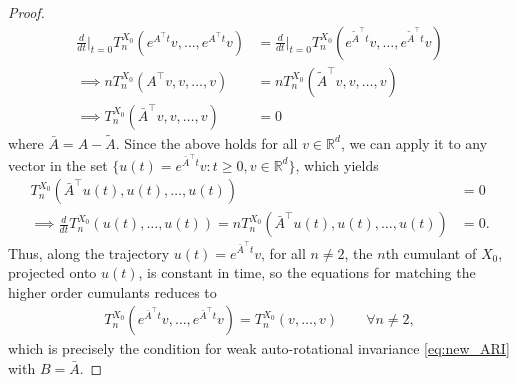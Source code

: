 \documentclass[twoside,11pt]{article}
\newcommand{\R} {\mathbb R}
\begin{document}
\begin{proof}
{\begin{align*}
    \frac{d}{dt}\bigg\rvert_{t=0}T_n^{X_0}(e^{A^\top t}v, \ldots, e^{A^\top t}v) &=\frac{d}{dt}\bigg\rvert_{t=0}T_n^{X_0}(e^{\tilde{A}^\top t}v, \ldots, e^{\tilde{A}^\top t} v)\\
    \implies nT_n^{X_0}(A^\top v,v, \ldots, v) &= nT_n^{X_0}(\tilde{A}^\top v, v,\ldots, v)\\
    \implies T_n^{X_0}(\bar{A}^\top v, v, \ldots, v) &=0
\end{align*}
where $\bar{A}=A-\tilde{A}$. Since the above holds for all $v \in \R^d$, we can apply it to any vector in the set $\{u(t)=e^{\bar{A}^\top t}v: t \ge 0, v \in \R^d\}$, which yields
\begin{align*}
    T_n^{X_0}(\bar{A}^\top u(t), u(t), \ldots, u(t))&=0 \\
    \implies \frac{d}{dt}T_n^{X_0}(u(t), \ldots, u(t))=nT_n^{X_0}(\bar{A}^\top u(t), u(t), \ldots, u(t))&=0.
\end{align*}
Thus, along the trajectory $u(t)=e^{\bar{A}^\top t}v$, for all $n \neq 2$, the $n$th cumulant of $X_0$, projected onto $u(t)$, is constant in time, so the equations for matching the higher order cumulants reduces to
\begin{align*}
    T_n^{X_0}(e^{\bar{A}^\top t}v, \ldots, e^{\bar{A}^\top t}v)= T_n^{X_0}(v, \ldots, v) \qquad \forall  n \neq 2,
\end{align*}
which is precisely the condition for weak auto-rotational invariance \eqref{eq:new_ARI} with $B = \bar{A}$.}


\end{proof}
\end{document}
